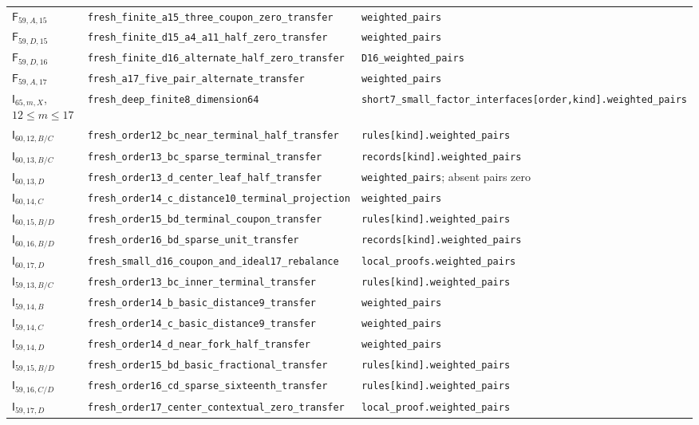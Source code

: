 \documentclass[11pt]{article}
\theoremstyle{remark}\newtheorem{remark}[theorem]{Remark}
\newcommand{\cert}[1]{\nolinkurl{#1}}
\begin{document}
{\begin{longtable}{@{}p{}p{}p{}@{}}
$\mathsf F_{59,A,15}$&\cert{fresh_finite_a15_three_coupon_zero_transfer}&\cert{weighted_pairs}\\
$\mathsf F_{59,D,15}$&\cert{fresh_finite_d15_a4_a11_half_zero_transfer}&\cert{weighted_pairs}\\
$\mathsf F_{59,D,16}$&\cert{fresh_finite_d16_alternate_half_zero_transfer}&\cert{D16_weighted_pairs}\\
$\mathsf F_{59,A,17}$&\cert{fresh_a17_five_pair_alternate_transfer}&\cert{weighted_pairs}\\
$\mathsf I_{65,m,X}$, $12\le m\le17$&\cert{fresh_deep_finite8_dimension64}&\cert{short7_small_factor_interfaces[order,kind].weighted_pairs}\\
$\mathsf I_{60,12,B/C}$&\cert{fresh_order12_bc_near_terminal_half_transfer}&\cert{rules[kind].weighted_pairs}\\
$\mathsf I_{60,13,B/C}$&\cert{fresh_order13_bc_sparse_terminal_transfer}&\cert{records[kind].weighted_pairs}\\
$\mathsf I_{60,13,D}$&\cert{fresh_order13_d_center_leaf_half_transfer}&\cert{weighted_pairs}; absent pairs zero\\
$\mathsf I_{60,14,C}$&\cert{fresh_order14_c_distance10_terminal_projection}&\cert{weighted_pairs}\\
$\mathsf I_{60,15,B/D}$&\cert{fresh_order15_bd_terminal_coupon_transfer}&\cert{rules[kind].weighted_pairs}\\
$\mathsf I_{60,16,B/D}$&\cert{fresh_order16_bd_sparse_unit_transfer}&\cert{records[kind].weighted_pairs}\\
$\mathsf I_{60,17,D}$&\cert{fresh_small_d16_coupon_and_ideal17_rebalance}&\cert{local_proofs.weighted_pairs}\\
$\mathsf I_{59,13,B/C}$&\cert{fresh_order13_bc_inner_terminal_transfer}&\cert{rules[kind].weighted_pairs}\\
$\mathsf I_{59,14,B}$&\cert{fresh_order14_b_basic_distance9_transfer}&\cert{weighted_pairs}\\
$\mathsf I_{59,14,C}$&\cert{fresh_order14_c_basic_distance9_transfer}&\cert{weighted_pairs}\\
$\mathsf I_{59,14,D}$&\cert{fresh_order14_d_near_fork_half_transfer}&\cert{weighted_pairs}\\
$\mathsf I_{59,15,B/D}$&\cert{fresh_order15_bd_basic_fractional_transfer}&\cert{rules[kind].weighted_pairs}\\
$\mathsf I_{59,16,C/D}$&\cert{fresh_order16_cd_sparse_sixteenth_transfer}&\cert{rules[kind].weighted_pairs}\\
$\mathsf I_{59,17,D}$&\cert{fresh_order17_center_contextual_zero_transfer}&\cert{local_proof.weighted_pairs}\\
\bottomrule
\end{longtable}
}
\end{document}
